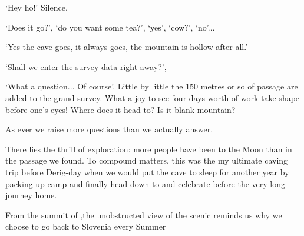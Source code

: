 
`Hey ho!' Silence. 

`Does it go?', `do you want some tea?', `yes', `cow?', `no'...

`Yes the cave goes, it always goes, the mountain is hollow after all.'

`Shall we enter the survey data right away?',

`What a question... Of course'. Little by little the 150 metres or so of passage are added to the grand survey. What a joy to see four days worth of work take shape before one's eyes! Where does it head to? Is it blank mountain? 

As ever we raise more questions than we actually answer.

There lies the thrill of exploration: more people have been to the Moon than in the passage we found. To compound matters, this was the my ultimate caving trip before Derig-day when we would put the cave to sleep for another year by packing up camp  and finally head down to  and celebrate before the very long journey home. 


\begin{pagefigure}
\checkoddpage \ifoddpage \forcerectofloat \else \forceversofloat \fi
\centering
{}
\caption{From the summit of \protect{},the unobstructed view of the scenic \protect{} reminds us why we choose to go back to Slovenia every Summer   }
\label{fig:plateau}
\end{pagefigure}



